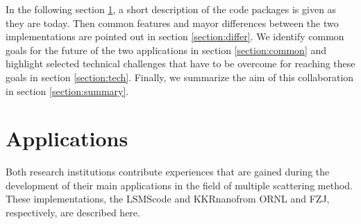 \documentclass{llncs}
\def\KKRnano{{KKRnano}}
\def\LSMS{{LSMS}}
\begin{document}
In the following section \ref{section:apps}, a short description of the code packages is given as they are today.
Then common features and mayor differences between the two implementations are pointed out in section \ref{section:differ}.
We identify common goals for the future of the two applications in section \ref{section:common}
and highlight selected technical challenges that have to be overcome for reaching these goals in section \ref{section:tech}.
Finally, we summarize the aim of this collaboration in section \ref{section:summary}.

\section{Applications} \label{section:apps}

Both research institutions contribute experiences that are gained during the development
of their main applications in the field of multiple scattering method.
These implementations, the \LSMS code and \KKRnano from ORNL and FZJ, respectively, are described here.

\end{document}
